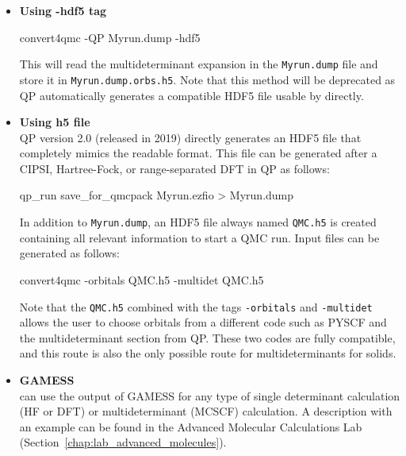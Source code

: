 \begin{itemize}
 \item \textbf{Using -hdf5 tag}\\

\begin{shade}
 convert4qmc -QP Myrun.dump -hdf5
\end{shade}

This will read the multideterminant expansion in the \texttt{Myrun.dump} file and store it in \texttt{Myrun.dump.orbs.h5}. Note that this method will be deprecated as QP automatically generates a compatible HDF5 file usable by \qmcpack directly. \\

 \item \textbf{Using h5 file }\\

QP version 2.0 (released in 2019) directly generates an HDF5 file that completely mimics the \qmcpack readable format. This file can be generated after a CIPSI, Hartree-Fock, or range-separated DFT in QP as follows: \\

\begin{shade}
 qp_run save_for_qmcpack Myrun.ezfio > Myrun.dump
\end{shade}

In addition to \texttt{Myrun.dump}, an HDF5 file always named \texttt{QMC.h5} is created containing all relevant information to start a QMC run. Input files can be generated as follows:\\

\begin{shade}
 convert4qmc -orbitals QMC.h5 -multidet QMC.h5
\end{shade}

Note that the \texttt{QMC.h5} combined with the tags \texttt{-orbitals} and \texttt{-multidet} allows the user to choose orbitals from a different code such as PYSCF and the multideterminant section from QP. These two codes are fully compatible, and this route is also the only possible route for multideterminants for solids. 

\item \textbf{GAMESS}\\
\qmcpack can use the output of GAMESS\cite{schmidt93} for any type of single determinant calculation (HF or DFT) or multideterminant (MCSCF) calculation. A description with an example can be found in the Advanced Molecular Calculations Lab (Section~\ref{chap:lab_advanced_molecules}).
\end{itemize}

